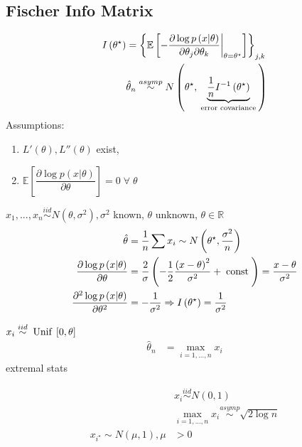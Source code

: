 \documentclass{article}
\begin{document}
\subsection{Fischer Info Matrix}
\begin{align*}
I\left(\theta^\star \right)  &= \left\{\mathbb{E}\left[- \dfrac{\partial \log p\left(x | \theta\right)}{\partial \theta_{j} \partial \theta_{k}} \bigg|_{\theta = \theta^\star }\right]\right\}_{j,k}
\\ &  \hat{\theta}_{n} \stackrel{asymp}{\sim} N\left(\theta^\star , \underbrace{\dfrac{1}{n} I^{-1}\left(\theta^\star \right)}_{\text{\;error covariance\;}}\right)
\end{align*}
Assumptions:
\begin{enumerate}
\item $L'\left(\theta\right) , L''\left(\theta\right)$ exist,
\item $\mathbb{E}\left[ \dfrac{\partial \log p\left(x | \theta\right)}{\partial \theta} \right] = 0 \;\forall\; \theta$
\end{enumerate}

\begin{eg} \label{eg:normtsmle} 
$x_{1}, ..., x_{n} \stackrel{iid}{\sim} N\left(\theta, \sigma^{2}\right), \sigma^{2}$ known, $\theta$ unknown, $\theta  \in \mathbb{R}$
\begin{align*}
\hat{\theta} &= \dfrac{1}{n} \displaystyle\sum x_{i} \sim  N\left(\theta^\star , \dfrac{\sigma^{2}}{n}\right)
\\ \dfrac{\partial \log p\left(x | \theta\right)}{\partial \theta} &= \dfrac{2}{\sigma} \left(- \dfrac{1}{2} \dfrac{\left(x - \theta\right)^{2}}{\sigma^{2}} + \text{\;const\;}\right) = \dfrac{x - \theta}{\sigma^{2}}
\\ \dfrac{\partial^2 \log p\left(x | \theta\right)}{\partial \theta^2} &= - \dfrac{1}{\sigma^{2}} \Rightarrow  I\left(\theta^\star \right)  = \dfrac{1}{\sigma^{2}}
\end{align*}\end{eg}
\begin{eg} \label{eg:unifmle} 
$x_{i} \stackrel{iid}{\sim} \text{\;Unif\;} \left[0, \theta\right]$
\begin{align*}
\hat{\theta}_{n} &= \displaystyle\max_{i = 1, ..., n} x_{i}
\end{align*}
extremal stats
\end{eg}
\begin{align*}
&x_{i} \stackrel{iid}{\sim} N\left(0, 1\right)
\\ &\displaystyle\max_{i = 1, ..., n} x_{i} \stackrel{asymp}{\sim} \sqrt{2 \log n}
\\ x_{i^\star } \sim  N\left(\mu, 1\right), \mu &> 0
\end{align*}
\end{document}
